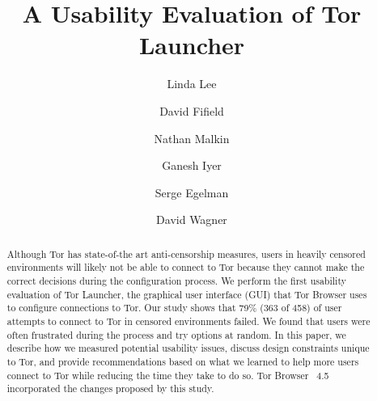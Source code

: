 \documentclass[USenglish,oneside,twocolumn]{article}
\begin{document}
  \author*[1]{Linda Lee}

  \author[2]{David Fifield}

  \author[3]{Nathan Malkin}

  \author[4]{Ganesh Iyer}

  \author[5]{Serge Egelman}
  
  \author[6]{David Wagner}




  
   

  \title{\huge A Usability Evaluation of Tor Launcher}



  \begin{abstract}
{
Although Tor has state-of-the art anti-censorship measures, users in heavily censored environments will likely not be able to connect to Tor because they cannot make the correct decisions during the configuration process. We perform the first usability evaluation of Tor Launcher, the graphical user interface (GUI) that Tor Browser uses to configure connections to Tor. Our study shows that 79\% (363 of 458) of user attempts to connect to Tor in censored environments failed. We found that users were often frustrated during the process and try options at random. In this paper, we describe how we measured potential usability issues, discuss design constraints unique to Tor, and provide recommendations based on what we learned to help more users connect to Tor while reducing the time they take to do so. Tor Browser ~4.5 incorporated the changes proposed by this study.
}
\end{abstract}
\end{document}
